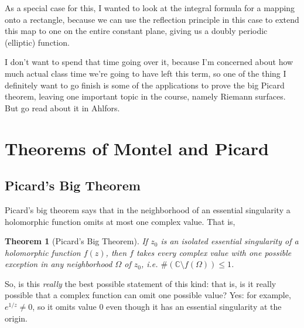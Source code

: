 \documentclass{article}
\newtheorem{theorem}{Theorem}
\newcommand{\mbb}[1]{\mathbb{#1}}
\begin{document}
As a special case for this, I wanted to look at the integral formula for a mapping onto a rectangle, because we can use the reflection principle in this case to extend this map to one on the entire constant plane, giving us a doubly periodic (elliptic) function.

I don't want to spend that time going over it, because I'm concerned about how much actual class time we're going to have left this term, so one of the thing I definitely want to go finish is some of the applications to prove the big Picard theorem, leaving one important topic in the course, namely Riemann surfaces. But go read about it in Ahlfors.


\section{Theorems of Montel and Picard}

\subsection{Picard's Big Theorem}

Picard's big theorem says that in the neighborhood of an essential singularity a holomorphic function omits at most one complex value. That is,
\begin{theorem}[Picard's Big Theorem]
If \(z_0\) is an isolated essential singularity of a holomorphic function \(f(z)\), then \(f\) takes every complex value with one possible exception in any neighborhood \(\Omega\) of \(z_0\), i.e. \(\#(\mbb{C}\setminus f(\Omega)) \leq 1\).
\end{theorem}
So, is this \textit{really} the best possible statement of this kind: that is, is it really possible that a complex function can omit one possible value? Yes: for example, \(e^{1/z} \neq 0\), so it omits value \(0\) even though it has an essential singularity at the origin.
\end{document}
